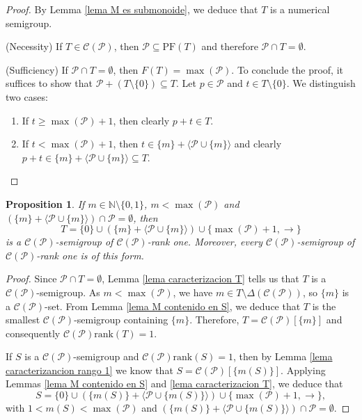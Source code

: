 \documentclass[11pt]{article}
\def\N{\mathbb{N}}
\newtheorem{proposition}[theorem]{Proposition}
\numberwithin{equation}{section}
\newcommand{\CP}{\mathcal C(\mathcal P)}
\newcommand{\rk}{\mathrm{rank}}
\begin{document}
\begin{proof}
    By Lemma \ref{lema M es submonoide}, we deduce that $T$ is a numerical semigroup.

    (Necessity) If $T\in\mathcal C(\mathcal P)$, then $\mathcal P\subseteq\mathrm{PF}(T)$ and therefore $\mathcal P\cap T=\emptyset$.

    (Sufficiency) If $\mathcal P\cap T=\emptyset$, then $F(T)=\max(\mathcal P)$. To conclude the proof, it suffices to show that $\mathcal P + (T\setminus\{0\})\subseteq T$. Let $p\in\mathcal P$ and $t\in T\setminus\{0\}$. We distinguish two cases:
    \begin{enumerate}
        \item If $t\geq \max(\mathcal P)+1$, then clearly $p+t\in T$.
        \item If $t<\max(\mathcal P)+1$, then $t\in\{m\}+\langle\mathcal P\cup\{m\}\rangle$ and clearly $p+t\in\{m\}+\langle \mathcal P\cup\{m\} \rangle\subseteq T$.
    \end{enumerate}
\end{proof}

\begin{proposition}\label{proposcion T rango uno}
    If $m\in\N\setminus\{0,1\}$, $m<\max(\mathcal P)$ and $(\{m\}+\langle\mathcal P\cup\{m\}\rangle)\cap\mathcal P=\emptyset$, then
    \[
    T=\{0\}\cup(\{m\}+\langle\mathcal P\cup\{m\}\rangle)\cup\{\max(\mathcal P)+1,\rightarrow\}
    \]
    is a $\mathcal C(\mathcal P)$-semigroup of $\mathcal C(\mathcal P)$-rank one. Moreover, every $\mathcal C(\mathcal P)$-semigroup of $\mathcal C(\mathcal P)$-rank one is of this form.
\end{proposition}

\begin{proof}
    Since $\mathcal P\cap T=\emptyset$, Lemma \ref{lema caracterizacion T} tells us that $T$ is a $\CP$-semigroup. As $m<\max(\mathcal P)$, we have $m\in T\setminus\Delta(\CP)$, so $\{m\}$ is a $\CP$-set. From Lemma \ref{lema M contenido en S}, we deduce that $T$ is the smallest $\mathcal C(\mathcal P)$-semigroup containing $\{m\}$. Therefore, $T=\mathcal C(\mathcal P)[\{m\}]$ and consequently $\CP\rk(T)=1$.

    If $S$ is a $\mathcal C(\mathcal P)$-semigroup and $\CP\rk(S)=1$, then by Lemma \ref{lema caracterizancion rango 1} we know that $S=\mathcal C(\mathcal P)[\{m(S)\}]$. Applying Lemmas \ref{lema M contenido en S} and \ref{lema caracterizacion T}, we deduce that
    \[
    S=\{0\}\cup(\{m(S)\}+\langle\mathcal P\cup\{m(S)\}\rangle)\cup\{\max(\mathcal P)+1,\rightarrow\},
    \]
    with $1<m(S)<\max(\mathcal P)$ and $(\{m(S)\}+\langle\mathcal P\cup\{m(S)\}\rangle)\cap \mathcal P=\emptyset$.
\end{proof}
\end{document}
